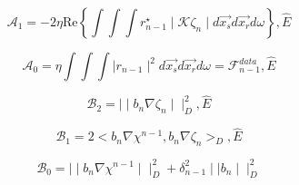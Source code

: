 \documentclass[10pt,a4paper]{article}
\newcommand{\real}[1]{\text{Re} \left\{ #1 \right\}}
\begin{document}
\begin{equation} \label{eq:eq25} \mathcal{A}_1 = -2 \eta \real{\int
\int \int r^{\star}_{n-1} \mid \mathcal{K} \zeta_n \mid
d\vec{x_s}d\vec{x_r}d\omega} , \hat{E} \end{equation}

\begin{equation} \label{eq:eq26} \mathcal{A}_0 = \eta \int \int \int
\mid r_{n-1} \mid^2 d\vec{x_s}d\vec{x_r}d\omega =
\mathcal{F}^{data}_{n-1} , \hat{E} \end{equation}

\begin{equation} \label{eq:eq27} \mathcal{B}_2 = \mid \mid b_n \nabla
\zeta_n \mid \mid^{2}_D , \hat{E} \end{equation}

\begin{equation} \label{eq:eq28} \mathcal{B}_1 = 2 < b_n
\nabla\chi^{n-1}, b_n \nabla \zeta_n >_D, \hat{E} \end{equation}

\begin{equation} \label{eq:eq29} \mathcal{B}_0 = \mid \mid b_n \nabla
\chi^{n-1} \mid \mid^{2}_D + \delta^{2}_{n-1} \mid \mid b_n \mid
\mid^{2}_D \end{equation}
\end{document}
